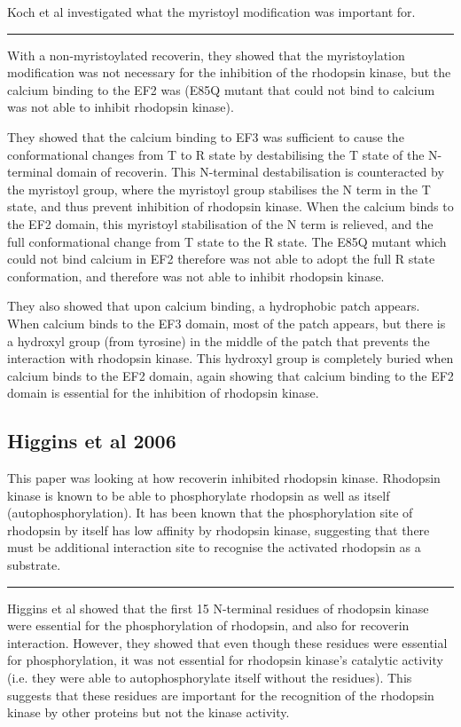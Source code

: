 \documentclass[a4paper,12pt]{article}
\begin{document}
Koch et al investigated what the myristoyl modification was important for.

\noindent\rule{\textwidth}{0.4pt}

With a non-myristoylated recoverin, they showed that the myristoylation modification was not necessary for the inhibition of the rhodopsin kinase, but the calcium binding to the EF2 was (E85Q mutant that could not bind to calcium was not able to inhibit rhodopsin kinase).

They showed that the calcium binding to EF3 was sufficient to cause the conformational changes from T to R state by destabilising the T state of the N-terminal domain of recoverin.
This N-terminal destabilisation is counteracted by the myristoyl group, where the myristoyl group stabilises the N term in the T state, and thus prevent inhibition of rhodopsin kinase.
When the calcium binds to the EF2 domain, this myristoyl stabilisation of the N term is relieved, and the full conformational change from T state to the R state.
The E85Q mutant which could not bind calcium in EF2 therefore was not able to adopt the full R state conformation, and therefore was not able to inhibit rhodopsin kinase.

They also showed that upon calcium binding, a hydrophobic patch appears.
When calcium binds to the EF3 domain, most of the patch appears, but there is a hydroxyl group (from tyrosine) in the middle of the patch that prevents the interaction with rhodopsin kinase.
This hydroxyl group is completely buried when calcium binds to the EF2 domain, again showing that calcium binding to the EF2 domain is essential for the inhibition of rhodopsin kinase.

\subsection*{Higgins et al 2006}

This paper was looking at how recoverin inhibited rhodopsin kinase.
Rhodopsin kinase is known to be able to phosphorylate rhodopsin as well as itself (autophosphorylation).
It has been known that the phosphorylation site of rhodopsin by itself has low affinity by rhodopsin kinase, suggesting that there must be additional interaction site to recognise the activated rhodopsin as a substrate.

\noindent\rule{\textwidth}{0.4pt}

Higgins et al showed that the first 15 N-terminal residues of rhodopsin kinase were essential for the phosphorylation of rhodopsin, and also for recoverin interaction.
However, they showed that even though these residues were essential for phosphorylation, it was not essential for rhodopsin kinase's catalytic activity (i.e. they were able to autophosphorylate itself without the residues).
This suggests that these residues are important for the recognition of the rhodopsin kinase by other proteins but not the kinase activity.
\end{document}
